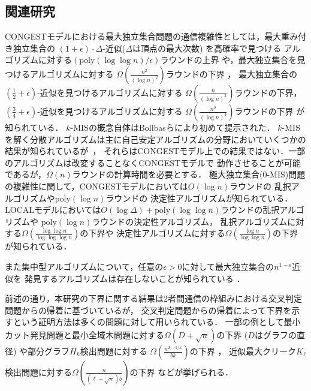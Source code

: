 \documentclass[11pt,a4paper]{jarticle}
\newcommand{\CONGEST}{\textsf{CONGEST}}
\newcommand{\LOCAL}{\textsf{LOCAL}}
\theoremstyle{definition}
\begin{document}
\subsection{関連研究} 
{\CONGEST}モデルにおける最大独立集合問題の通信複雑性としては，最大重み付き独立集合の
$(1 + \epsilon) \cdot \Delta$-近似($\Delta$は頂点の最大次数) を高確率で見つける
アルゴリズムに対する$\left(\mathrm{poly}(\log \log n)/\epsilon \right)$ラウンドの上界
\cite{kawarabayashi2019improved} や，最大独立集合を見つけるアルゴリズムに対する
$\Omega \left(\frac{n^{2}}{(\log n)^{2}}\right)$ラウンドの下界 \cite{censor2017quadratic}，
最大独立集合の$(\frac{1}{2} + \epsilon)$-近似を見つけるアルゴリズムに対する
$\Omega \left(\frac{n}{(\log n)^{3}}\right)$ラウンドの下界，
$(\frac{3}{4} + \epsilon)$-近似を見つけるアルゴリズムに対する
$\Omega \left(\frac{n^{2}}{(\log n)^{3}}\right)$ラウンドの下界 \cite{efron2020beyond} が知られている．
$k$-MISの概念自体はBollbasらにより初めて提示された\cite{bollobas1991generalised}．
$k$-MISを解く分散アルゴリズムは主に自己安定アルゴリズムの分野においていくつかの結果が知られているが~\cite{turau2007linear,tanaka2019self}，
それらは{\CONGEST}モデル上での結果ではない．一部のアルゴリズムは改変することなく{\CONGEST}モデルで
動作させることが可能であるが，$\Omega(n)$ラウンドの計算時間を必要とする．
極大独立集合(0-MIS)問題の複雑性に関して，{\CONGEST}モデルにおいては$O(\log n)$ラウンドの
乱択アルゴリズム\cite{luby1986simple}や$\mathrm{poly}(\log n)$ラウンドの
決定性アルゴリズム\cite{rozhovn2020polylogarithmic}が知られている．
{\LOCAL}モデルにおいては$O(\log \Delta) + \mathrm{poly}(\log \log n)$ラウンドの乱択アルゴリズムや
$\mathrm{poly}(\log n)$ラウンドの決定性アルゴリズム\cite{rozhovn2020polylogarithmic}，
乱択アルゴリズムに対する$\Omega \left(\frac{\log \log n}{\log \log \log n} \right)$の下界や
決定性アルゴリズムに対する$\Omega \left(\frac{\log n}{\log \log n} \right)$の下界
\cite{balliu2019lower}が知られている．

また集中型アルゴリズムについて，任意の$\epsilon > 0$に対して最大独立集合の$n^{1 - \epsilon}$近似を
発見するアルゴリズムは存在しないことが知られている \cite{haastad1999clique}．
 
前述の通り，本研究の下界に関する結果は2者間通信の枠組みにおける交叉判定問題からの帰着に基づいているが，
交叉判定問題からの帰着によって下界を示すという証明方法は多くの問題に対して用いられている．
一部の例として最小カット発見問題と最小全域木問題に対する$\Omega (D + \sqrt{n})$の下界
($D$はグラフの直径) \cite{sarma2012distributed}や部分グラフ$H_{k}$検出問題に対する
$\Omega \left(\frac{n^{2 - 1/k}}{bk}\right)$の下界 \cite{fischer2018possibilities}，
近似最大クリーク$K_{\ell}$検出問題に対する$\Omega \left(\frac{n}{(\ell + \sqrt{n})b}\right)$の下界
 \cite{czumaj2020detecting}などが挙げられる．
\end{document}
